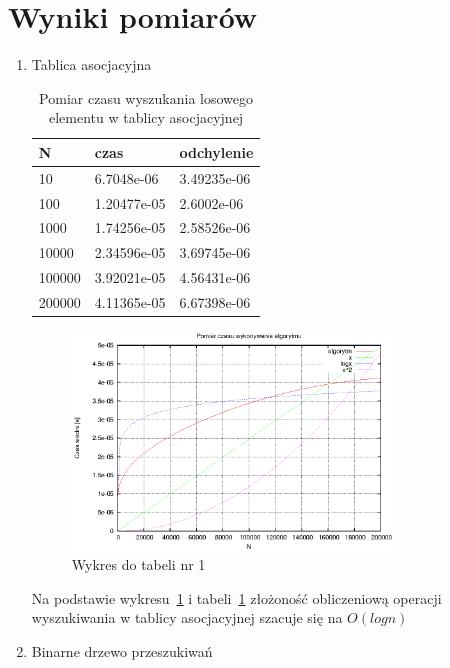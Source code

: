 \documentclass[a4paper,11pt]{article}
\begin{document}
\section{Wyniki pomiarów}
\begin{enumerate}
 \item Tablica asocjacyjna
   
  \begin{table}[th]
  \centering
    \caption{Pomiar czasu wyszukania losowego elementu w tablicy asocjacyjnej}

      \begin{tabular}{|l|l|l|}
	\hline
	N & czas & odchylenie \\
    \hline
  10 & 6.7048e-06 &  3.49235e-06\\
  \hline
100 & 1.20477e-05 &  2.6002e-06\\
\hline
1000 & 1.74256e-05 &  2.58526e-06\\
\hline
10000 & 2.34596e-05 &  3.69745e-06\\
\hline
100000 & 3.92021e-05 &  4.56431e-06\\
\hline
200000 & 4.11365e-05 &  6.67398e-06\\
\hline
    \end{tabular}
    \label{tab1}
    \end{table}
    \newpage
 \begin{figure}[th]
\centering
\includegraphics[width=0.8\textwidth]{../prj/wykres12.eps}
\caption{Wykres do tabeli nr 1}
\label{Wykres1}
\end{figure} 
Na podstawie wykresu~\ref{Wykres1} i tabeli~\ref{tab1} złożoność obliczeniową operacji wyszukiwania w tablicy asocjacyjnej szacuje się na $ O(logn) $
\item Binarne drzewo przeszukiwań

  \begin{table}[th]
  \centering
  

\end{table}
\end{enumerate}
\end{document}

